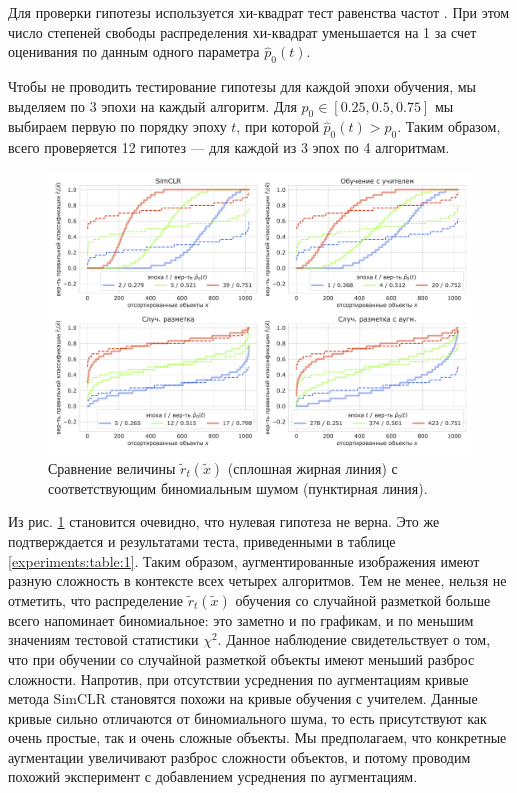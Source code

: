 \noindent
Для проверки гипотезы используется хи-квадрат тест равенства частот \cite{chisquare}. При этом число степеней свободы распределения хи-квадрат уменьшается на 1 за счет оценивания по данным одного параметра $\widehat{p}_0(t)$.

Чтобы не проводить тестирование гипотезы для каждой эпохи обучения, мы выделяем по 3 эпохи на каждый алгоритм. Для $p_0 \in [0.25, 0.5, 0.75]$ мы выбираем первую по порядку эпоху $t$, при которой $\widehat{p}_0(t) > p_0$. Таким образом, всего проверяется 12 гипотез --- для каждой из 3 эпох по 4 алгоритмам.

\begin{figure}[H]
    \centering
    \includegraphics[width=17cm]{images/binom_noise1.pdf}
    \caption{Сравнение величины $\tilde{r}_t(\tilde{x})$ (сплошная жирная линия) с соответствующим биномиальным шумом (пунктирная линия).}
    \label{experiments:pic:3}
\end{figure}{}

Из рис. \ref{experiments:pic:3} становится очевидно, что нулевая гипотеза не верна. Это же подтверждается и результатами теста, приведенными в таблице \ref{experiments:table:1}. Таким образом, аугментированные изображения имеют разную сложность в контексте всех четырех алгоритмов. Тем не менее, нельзя не отметить, что распределение $\tilde{r}_t(\tilde{x})$ обучения со случайной разметкой больше всего напоминает биномиальное: это заметно и по графикам, и по меньшим значениям тестовой статистики $\chi^2$. Данное наблюдение свидетельствует о том, что при обучении со случайной разметкой объекты имеют меньший разброс сложности. Напротив, при отсутствии усреднения по аугментациям кривые метода SimCLR становятся похожи на кривые обучения с учителем. Данные кривые сильно отличаются от биномиального шума, то есть присутствуют как очень простые, так и очень сложные объекты. Мы предполагаем, что конкретные аугментации увеличивают разброс сложности объектов, и потому проводим похожий эксперимент с добавлением усреднения по аугментациям.


